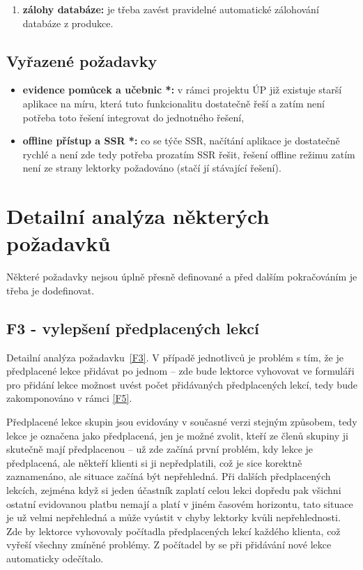 \begin{enumerate}[label=\textbf{N\arabic*}]
    \item \label{N8} \textbf{zálohy databáze:} je třeba zavést pravidelné automatické zálohování databáze z produkce.
\end{enumerate}

\subsection{Vyřazené požadavky}\label{subsec:vyrazenepozadavky}
\begin{itemize}
    \item \textbf{evidence pomůcek a učebnic *:} v rámci projektu ÚP již existuje starší aplikace na míru, která tuto funkcionalitu dostatečně řeší a zatím není potřeba toto řešení integrovat do jednotného řešení,
    \item \textbf{offline přístup a SSR *:} co se týče SSR, načítání aplikace je dostatečně rychlé a není zde tedy potřeba prozatím SSR řešit, řešení offline režimu zatím není ze strany lektorky požadováno (stačí jí stávající řešení).
\end{itemize}

\section{Detailní analýza některých požadavků}

Některé požadavky nejsou úplně přesně definované a před dalším pokračováním je třeba je dodefinovat.

\subsection{F3 - vylepšení předplacených lekcí}\label{subsec:F3detail}

Detailní analýza požadavku~\ref{F3}.
V případě jednotlivců je problém s tím, že je předplacené lekce přidávat po jednom -- zde bude lektorce vyhovovat ve formuláři pro přidání lekce možnost uvést počet přidávaných předplacených lekcí, tedy bude zakomponováno v rámci \ref{F5}.

Předplacené lekce skupin jsou evidovány v současné verzi stejným způsobem, tedy lekce je označena jako předplacená, jen je možné zvolit, kteří ze členů skupiny ji skutečně mají předplacenou -- už zde začíná první problém, kdy lekce je předplacená, ale někteří klienti si ji nepředplatili, což je sice korektně zaznamenáno, ale situace začíná být nepřehledná. Při dalších předplacených lekcích, zejména když si jeden účastník zaplatí celou lekci dopředu pak všichni ostatní evidovanou platbu nemají a platí v jiném časovém horizontu, tato situace je už velmi nepřehledná a může vyústit v chyby lektorky kvůli nepřehlednosti. Zde by lektorce vyhovovaly počítadla předplacených lekcí každého klienta, což vyřeší všechny zmíněné problémy. Z počítadel by se při přidávání nové lekce automaticky odečítalo.

